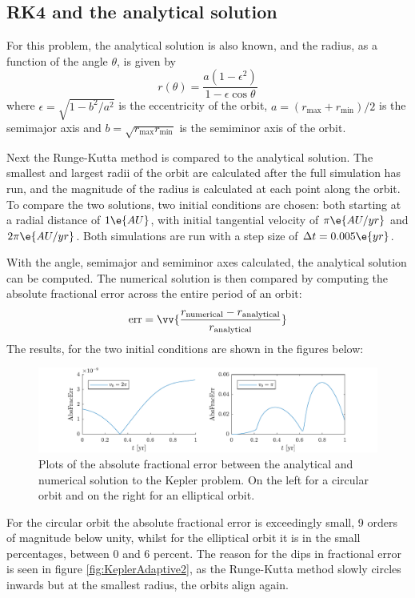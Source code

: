 \documentclass[a4paper,10pt]{article} 	%
\numberwithin{equation}{section}
\begin{document}
	\subsection{RK4 and the analytical solution}
	For this problem, the analytical solution is also known, and the radius, as a function of the angle $ \theta $, is given by
	\begin{equation}
		r(\theta) = \frac{a(1-\epsilon^2)}{1-\epsilon \cos \theta}
	\end{equation}
	where $ \epsilon = \sqrt{1-b^2/a^2}$ is the eccentricity of the orbit, $ a = (r_{\text{max}}+r_{\text{min}})/2$ is the semimajor axis and $ b = \sqrt{r_{\text{max}}r_{\text{min}}}$ is the semiminor axis of the orbit.
	
	Next the Runge-Kutta method is compared to the analytical solution. The smallest and largest radii of the orbit are calculated after the full simulation has run, and the magnitude of the radius is calculated at each point along the orbit. To compare the two solutions, two initial conditions are chosen: both starting at a radial distance of $ 1 \e{AU} $, with initial tangential velocity of $ \pi \e{AU/yr} $ and $ 2 \pi \e{AU/yr} $. Both simulations are run with a step size of $ \Delta t  = 0.005 \e{yr} $.
	
	With the angle, semimajor and semiminor axes calculated, the analytical solution can be computed. The numerical solution is then compared by computing the absolute fractional error across the entire period of an orbit:
	\begin{equation}
		\text{err} = \vv{\frac{r_{\text{numerical}}-r_{\text{analytical}}}{r_{\text{analytical}}}}
	\end{equation}
	The results, for the two initial conditions are shown in the figures below:
	\begin{figure}[H]
		\centering
		\includegraphics[width = \linewidth]{KeplerFracErr.pdf}
		\caption{Plots of the absolute fractional error between the analytical and numerical solution to the Kepler problem. On the left for a circular orbit and on the right for an elliptical orbit.}
		\label{fig:KeplerAnalytical}
	\end{figure}
	For the circular orbit the absolute fractional error is exceedingly small, 9 orders of magnitude below unity, whilst for the elliptical orbit it is in the small percentages, between 0 and 6 percent. The reason for the dips in fractional error is seen in figure \ref{fig:KeplerAdaptive2}, as the Runge-Kutta method slowly circles inwards but at the smallest radius, the orbits align again.
\end{document}
